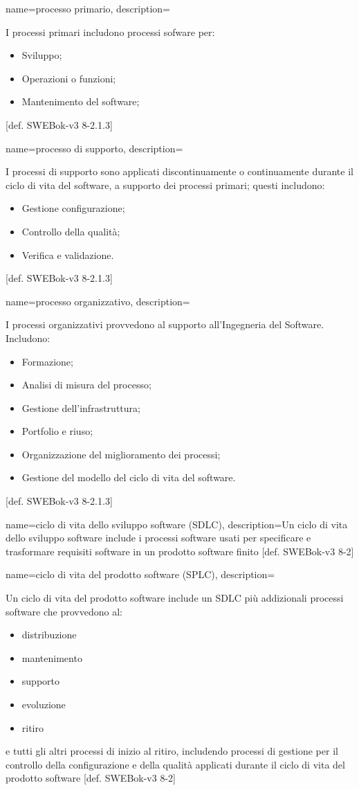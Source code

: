 {
name=processo primario,
description={I processi primari includono processi sofware per: \begin{itemize}
\item Sviluppo;
\item Operazioni o funzioni;
\item Mantenimento del software;
\end{itemize}
[def. SWEBok-v3 8-2.1.3]}
}

{
name=processo di supporto,
description={I processi di supporto sono applicati discontinuamente o continuamente durante il ciclo di vita del software, a supporto dei processi primari; questi includono:\begin{itemize}
\item Gestione configurazione;
\item Controllo della qualit\`a;
\item Verifica e validazione.
\end{itemize}
[def. SWEBok-v3 8-2.1.3]}
}

{
name=processo organizzativo,
description={I processi organizzativi provvedono al supporto all'Ingegneria del Software. Includono: \begin{itemize}
\item Formazione;
\item Analisi di misura del processo;
\item Gestione dell'infrastruttura;
\item Portfolio e riuso;
\item Organizzazione del miglioramento dei processi;
\item Gestione del modello del ciclo di vita del software.
\end{itemize}
[def. SWEBok-v3 8-2.1.3]}
}

{
name=ciclo di vita dello sviluppo software (SDLC),
description={Un ciclo di vita dello sviluppo software include i processi software usati per specificare e trasformare requisiti software in un prodotto software finito [def. SWEBok-v3 8-2]}
}

{
name=ciclo di vita del prodotto software (SPLC),
description={Un ciclo di vita del prodotto software include un SDLC pi\`u addizionali processi software che provvedono al: \begin{itemize}
\item distribuzione
\item mantenimento
\item supporto
\item evoluzione
\item ritiro
\end{itemize}
e tutti gli altri processi di inizio al ritiro, includendo processi di gestione per il controllo della configurazione e della qualit\`a applicati durante il ciclo di vita del prodotto software [def. SWEBok-v3 8-2]}
}

